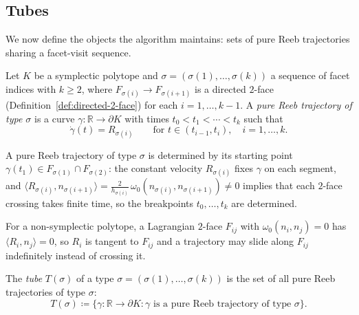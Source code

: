 \subsection{Tubes}\label{subsec:tubes}

We now define the objects the algorithm maintains:
sets of pure Reeb trajectories sharing a facet-visit sequence.

\begin{definition}\label{def:pure-reeb-trajectory}
Let $K$ be a symplectic polytope and
$\sigma = (\sigma(1), \ldots, \sigma(k))$ a sequence of facet indices with $k \geq 2$,
where $F_{\sigma(i)} \to F_{\sigma(i+1)}$ is a directed $2$-face
(Definition~\ref{def:directed-2-face}) for each $i = 1, \ldots, k-1$.
A \emph{pure Reeb trajectory of type $\sigma$} is a curve
$\gamma \colon \mathbb{R} \to \partial K$
with times $t_0 < t_1 < \cdots < t_k$ such that
\[
  \dot{\gamma}(t) = R_{\sigma(i)}
  \qquad \text{for } t \in (t_{i-1}, t_i),
  \quad i = 1, \ldots, k.
\]
\end{definition}

\begin{remark}[Determinedness]\label{rem:pure-reeb-determined}
A pure Reeb trajectory of type $\sigma$ is determined by its
starting point $\gamma(t_1) \in F_{\sigma(1)} \cap F_{\sigma(2)}$:
the constant velocity $R_{\sigma(i)}$ fixes $\gamma$ on each segment,
and $\langle R_{\sigma(i)}, n_{\sigma(i+1)} \rangle
= \tfrac{2}{h_{\sigma(i)}}\,\omega_0(n_{\sigma(i)}, n_{\sigma(i+1)}) \neq 0$
implies that each $2$-face crossing takes finite time,
so the breakpoints $t_0, \ldots, t_k$ are determined.

For a non-symplectic polytope, a Lagrangian $2$-face
$F_{ij}$ with $\omega_0(n_i, n_j) = 0$
has $\langle R_i, n_j \rangle = 0$,
so $R_i$ is tangent to $F_{ij}$ and a trajectory may slide along
$F_{ij}$ indefinitely instead of crossing it.
\end{remark}

\begin{definition}[Tube]\label{def:tube}
The \emph{tube} $T(\sigma)$ of a type $\sigma = (\sigma(1), \ldots, \sigma(k))$
is the set of all pure Reeb trajectories of type $\sigma$:
\[
  T(\sigma) \coloneqq \bigl\{
    \gamma \colon \mathbb{R} \to \partial K
    : \gamma \text{ is a pure Reeb trajectory of type } \sigma
  \bigr\}.
\]
\end{definition}

